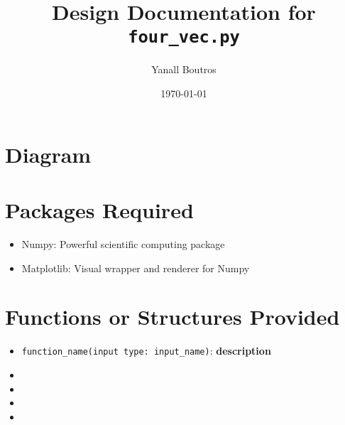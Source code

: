 \documentclass{article}
\begin{document}
\title{Design Documentation for \texttt{four\_vec.py}}
\author{Yanall Boutros}
\date{\today}
\maketitle
\section*{Diagram}
\section*{Packages Required}
\begin{itemize}
  \item Numpy:      Powerful scientific computing package
  \item Matplotlib: Visual wrapper and renderer for Numpy
\end{itemize}
\section*{Functions or Structures Provided}
\begin{itemize}
  \item \texttt{function\_name(input type: input\_name)}:
    \textbf{description}
  \item 
  \item
  \item
  \item
\end{itemize}
\end{document}
